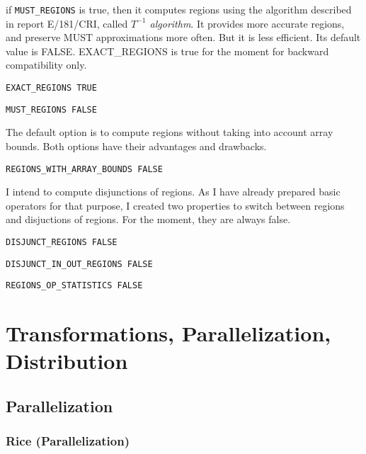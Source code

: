 if {\tt MUST\_REGIONS} is true, then it computes regions using the
algorithm described in report E/181/CRI, called {\em $T^{-1}$
algorithm}. It provides more accurate regions, and preserve MUST
approximations more often. But it is less efficient. Its default value
is FALSE. EXACT\_REGIONS is true for the moment for backward
compatibility only.

\begin{verbatim}
EXACT_REGIONS TRUE
\end{verbatim}

\begin{verbatim}
MUST_REGIONS FALSE
\end{verbatim}

The default option is to compute regions without taking into account array
bounds. Both options have their advantages and drawbacks. 

\begin{verbatim}
REGIONS_WITH_ARRAY_BOUNDS FALSE
\end{verbatim}

I intend to compute disjunctions of regions. As I have already prepared basic
operators for that purpose, I created two properties to switch between regions
and disjuctions of regions. For the moment, they are always false.

\begin{verbatim}
DISJUNCT_REGIONS FALSE
\end{verbatim}

\begin{verbatim}
DISJUNCT_IN_OUT_REGIONS FALSE
\end{verbatim}


\begin{verbatim}
REGIONS_OP_STATISTICS FALSE
\end{verbatim}

\section{Transformations, Parallelization, Distribution}
\label{section-transformations}


\subsection{Parallelization}

\subsubsection{Rice (Parallelization)}


